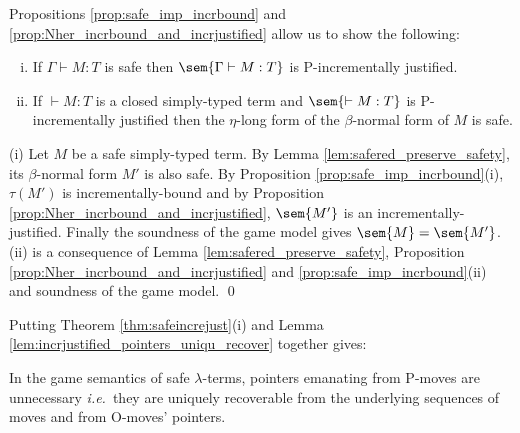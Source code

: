 Propositions \ref{prop:safe_imp_incrbound} and
\ref{prop:Nher_incrbound_and_incrjustified} allow us to show the
following:
\begin{theorem}
\label{thm:safeincrejust} \hfill
\begin{enumerate}[(i)]
\item If $\Gamma \vdash M : T$ is safe then $\sem{\Gamma \vdash M : T}$ is P-incrementally justified.
\item If $\vdash M : T$ is a closed simply-typed term and $\sem{\vdash M : T}$ is P-incrementally justified then the $\eta$-long form of the $\beta$-normal form of $M$ is safe.
\end{enumerate}
\end{theorem}
\proof (i) Let $M$ be a safe simply-typed term. By Lemma
\ref{lem:safered_preserve_safety}, its $\beta$-normal form $M'$ is
also safe. By Proposition \ref{prop:safe_imp_incrbound}(i),
$\tau(M')$ is incrementally-bound and by Proposition
\ref{prop:Nher_incrbound_and_incrjustified}, $\sem{M'}$ is an
incrementally-justified. Finally the soundness of the game model
gives $\sem{M} = \sem{M'}$.  (ii) is a consequence of Lemma
\ref{lem:safered_preserve_safety}, Proposition
\ref{prop:Nher_incrbound_and_incrjustified} and
\ref{prop:safe_imp_incrbound}(ii) and soundness of the game model.
\qed



Putting Theorem \ref{thm:safeincrejust}(i) and Lemma
\ref{lem:incrjustified_pointers_uniqu_recover} together gives:
\begin{proposition}
  \label{prop:safe_ptr_recoverable} In the game semantics of safe
  $\lambda$-terms, pointers emanating from P-moves are unnecessary
  {\it i.e.}~they are uniquely recoverable from the underlying sequences of
  moves and from O-moves' pointers.
\end{proposition}


